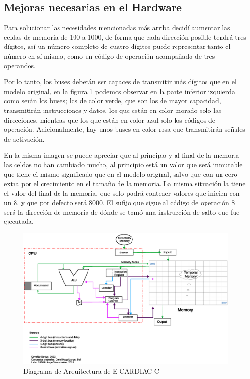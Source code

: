 \documentclass[letterpaper,12pt,oneside]{book}
\begin{document}
		\subsection{Mejoras necesarias en el Hardware}
		
		Para solucionar las necesidades mencionadas más arriba decidí aumentar las celdas de memoria de 100 a 1000, de forma que cada dirección posible tendrá
		tres dígitos, así un número completo de cuatro dígitos puede representar tanto el número en sí mismo, como un código de operación acompañado de tres operandos.
  
        Por lo tanto, los buses deberán ser capaces de transmitir más dígitos que en el modelo original, en la figura \ref{fig:diagarquiConc} 
		podemos observar
		en la parte inferior izquierda como serán los buses; los de color verde, que son los de mayor capacidad, transmitirán instrucciones y datos, los
		que están en color morado solo las direcciones, mientras que los que están en color azul solo los códigos de operación. Adicionalmente, hay unos buses
		en color rosa que transmitirán señales de activación.
  
        En la misma imagen se puede apreciar que al principio y al final de la memoria las celdas no han cambiado
		mucho, al principio está un valor que será inmutable que tiene el mismo significado que en el modelo original, salvo que con un cero extra por el crecimiento
		en el tamaño de la memoria. La misma situación la tiene el valor del final de la memoria, que solo podrá contener valores que inicien con un $8$, y
		que por defecto será $8000$. El sufijo que sigue al código de operación $8$ será la dirección de memoria de dónde se tomó una instrucción de salto 
		que fue ejecutada.
				
		\begin{figure}[h]		
			\centering
			\includegraphics[scale=0.5]{media/CARDIACC/Arquitectura_diagrama_concurrente.eps}
			\caption{Diagrama de Arquitectura de E-CARDIAC C}
			\label{fig:diagarquiConc}
		\end{figure}
		
\end{document}
